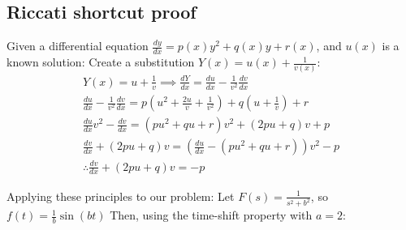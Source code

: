 \documentclass{scrartcl}
\begin{document}
\subsection{Riccati shortcut proof}
Given a differential equation \(\frac{dy}{dx} = p(x)y^2 + q(x)y + r(x)\), and \(u(x)\) is a known solution:
Create a substitution \(Y(x) = u(x) + \frac{1}{v(x)}\):
\begin{gather}
    Y(x) = u + \frac{1}{v} \implies \frac{dY}{dx} = \frac{du}{dx} - \frac{1}{v^2}\frac{dv}{dx} \\
    \frac{du}{dx} - \frac{1}{v^2}\frac{dv}{dx} = p\left(u^2+\frac{2u}{v} + \frac{1}{v^2}\right) + q\left(u + \frac{1}{v}\right) + r \\
    \frac{du}{dx}v^2 - \frac{dv}{dx} = (pu^2 + qu + r)v^2 + (2pu + q)v + p \\
    \frac{dv}{dx} + (2pu+q)v = (\frac{du}{dx} - (pu^2 + qu + r))v^2 - p \\
    \therefore{} \frac{dv}{dx} + (2pu + q)v = -p
\end{gather}

Applying these principles to our problem:
Let $F(s) = \frac{1}{s^2+b^2}$, so $f(t) = \frac{1}{b}\sin(bt)$
Then, using the time-shift property with $a = 2$:

\end{document}

